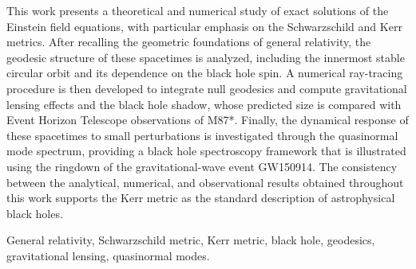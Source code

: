 	
	\hypersetup{pageanchor=true}

	This work presents a theoretical and numerical study of exact solutions of the Einstein field equations, with particular emphasis on the Schwarzschild and Kerr metrics. After recalling the geometric foundations of general relativity, the geodesic structure of these spacetimes is analyzed, including the innermost stable circular orbit and its dependence on the black hole spin. A numerical ray-tracing procedure is then developed to integrate null geodesics and compute gravitational lensing effects and the black hole shadow, whose predicted size is compared with Event Horizon Telescope observations of M87*. Finally, the dynamical response of these spacetimes to small perturbations is investigated through the quasinormal mode spectrum, providing a black hole spectroscopy framework that is illustrated using the ringdown of the gravitational-wave event GW150914. The consistency between the analytical, numerical, and observational results obtained throughout this work supports the Kerr metric as the standard description of astrophysical black holes.

	\vspace{0.3cm}
	\noindent\textbf{} General relativity, Schwarzschild metric, Kerr metric, black hole, geodesics, gravitational lensing, quasinormal modes.
	
